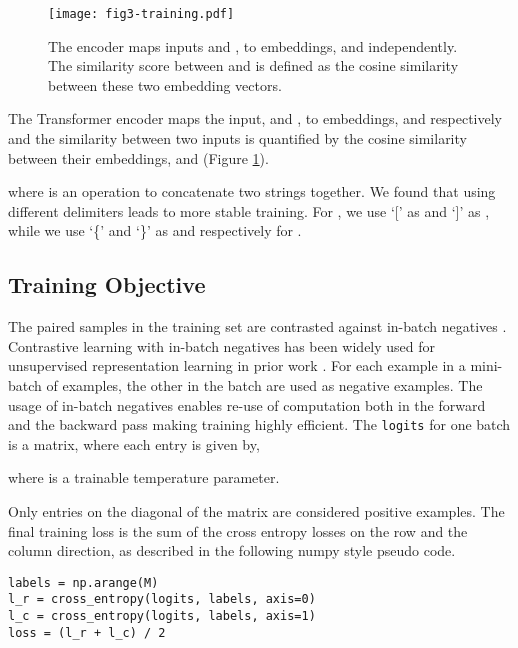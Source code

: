 \documentclass[nohyperref]{article}
\begin{document}
\begin{figure}[h]
\centering
\texttt{[image: fig3-training.pdf]}
\caption{The encoder  maps inputs  and , to embeddings,  and  independently. The similarity score between  and  is defined as the cosine similarity between these two embedding vectors.}
\label{fig:train}
\end{figure}

The Transformer encoder maps the input,  and , to embeddings,  and  respectively and the similarity between two inputs is quantified by the cosine similarity between their embeddings,  and  (Figure \ref{fig:train}).


where  is an operation to concatenate two strings together. We found that using different delimiters leads to more stable training. For , we use `['  as  and `]' as , while we use `\{' and `\}' as  and  respectively for . 

\subsection{Training Objective}
\label{sec:training}

The paired samples in the training set are contrasted against in-batch negatives \cite{contrastive,inbatch}. Contrastive learning with in-batch negatives has been widely used for unsupervised representation learning in prior work \cite{clip,align,Chen,contreiver}. For each example in a mini-batch of  examples, the other  in the batch are used as negative examples. The usage of in-batch negatives enables re-use of computation both in the forward and the backward pass making training highly efficient. The \texttt{logits} for one batch is a  matrix, where each entry  is given by,



where  is a trainable temperature parameter.

Only entries on the diagonal of the matrix are considered positive examples. The final training loss is the sum of the cross entropy losses on the row and the column direction, as described in the following numpy style pseudo code.



\begin{small}
\begin{verbatim}
labels = np.arange(M)
l_r = cross_entropy(logits, labels, axis=0)
l_c = cross_entropy(logits, labels, axis=1)
loss = (l_r + l_c) / 2
\end{verbatim}
\end{small}
\end{document}
